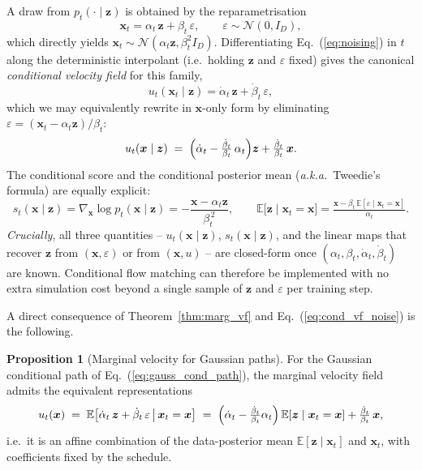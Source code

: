 \documentclass[11pt]{article}
\newcommand{\EE}{\mathbb{E}}
\newcommand{\e}{\varepsilon}
\DeclareRobustCommand{\xvec}{\bm{x}}
\DeclareRobustCommand{\zvec}{\bm{z}}
\theoremstyle{definition}
\newtheorem{proposition}[definition]{Proposition}
\begin{document}
A draw from $p_t(\cdot\mid\zvec)$ is obtained by the reparametrisation
\begin{equation}
  \xvec_t = \alpha_t\,\zvec + \beta_t\,\e, \qquad \e\sim\mathcal N(0,I_D),
  \label{eq:noising}
\end{equation}
which directly yields $\xvec_t\sim\mathcal N(\alpha_t\zvec,\beta_t^2 I_D)$. Differentiating Eq.~(\ref{eq:noising}) in $t$ along the deterministic interpolant (i.e.\ holding $\zvec$ and $\e$ fixed) gives the canonical \emph{conditional velocity field} for this family,
\begin{equation}
  u_t(\xvec_t\mid\zvec) = \dot\alpha_t\,\zvec + \dot\beta_t\,\e,
  \label{eq:cond_vf_noise}
\end{equation}
which we may equivalently rewrite in $\xvec$-only form by eliminating $\e=(\xvec_t-\alpha_t\zvec)/\beta_t$:
\begin{equation}
  u_t(\xvec\mid\zvec)
  \;=\; \Bigl(\dot\alpha_t - \tfrac{\dot\beta_t}{\beta_t}\,\alpha_t\Bigr)\zvec + \tfrac{\dot\beta_t}{\beta_t}\,\xvec.
  \label{eq:cond_vf}
\end{equation}
The conditional score and the conditional posterior mean (\emph{a.k.a.}\ Tweedie's formula) are equally explicit:
\begin{equation}
  s_t(\xvec\mid\zvec) = \nabla_{\xvec}\log p_t(\xvec\mid\zvec) = -\frac{\xvec-\alpha_t\zvec}{\beta_t^{\,2}},
  \qquad
  \EE\bigl[\zvec\mid\xvec_t\!=\!\xvec\bigr]
  = \tfrac{\xvec-\beta_t\,\EE[\e\mid\xvec_t\!=\!\xvec]}{\alpha_t}.
  \label{eq:cond_score}
\end{equation}
\emph{Crucially}, all three quantities -- $u_t(\xvec\mid\zvec)$, $s_t(\xvec\mid\zvec)$, and the linear maps that recover $\zvec$ from $(\xvec,\e)$ or from $(\xvec,u)$ -- are closed-form once $(\alpha_t,\beta_t,\dot\alpha_t,\dot\beta_t)$ are known. Conditional flow matching can therefore be implemented with no extra simulation cost beyond a single sample of $\zvec$ and $\e$ per training step.

A direct consequence of Theorem~\ref{thm:marg_vf} and Eq.~(\ref{eq:cond_vf_noise}) is the following.

\begin{proposition}[Marginal velocity for Gaussian paths]
\label{prop:marg_vf_gauss}
For the Gaussian conditional path of Eq.~(\ref{eq:gauss_cond_path}), the marginal velocity field admits the equivalent representations
\begin{equation}
  u_t(\xvec) \;=\; \EE\bigl[\dot\alpha_t\,\zvec + \dot\beta_t\,\e \,\big|\, \xvec_t=\xvec\bigr]
            \;=\; \Bigl(\dot\alpha_t - \tfrac{\dot\beta_t}{\beta_t}\alpha_t\Bigr)\,\EE[\zvec\mid\xvec_t=\xvec] + \tfrac{\dot\beta_t}{\beta_t}\,\xvec,
\end{equation}
i.e.\ it is an affine combination of the data-posterior mean $\EE[\zvec\mid\xvec_t]$ and $\xvec_t$, with coefficients fixed by the schedule.
\end{proposition}
\end{document}
